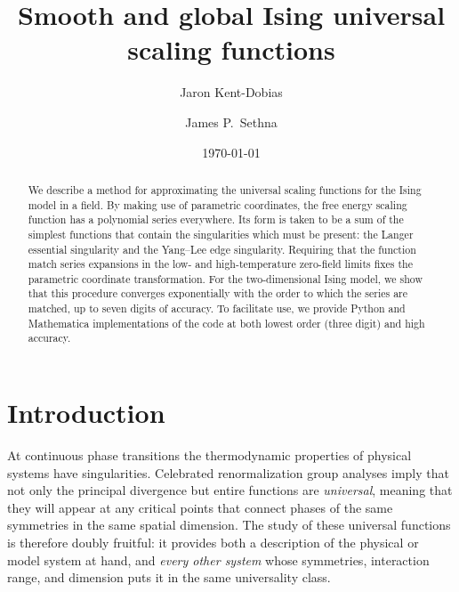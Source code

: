 \documentclass[
aps,
pre,
preprint,
longbibliography,
floatfix
]{revtex4-2}
\begin{document}
\title{Smooth and global Ising universal scaling functions}

\author{Jaron Kent-Dobias}

\author{James P.~Sethna}

\date\today

\begin{abstract}
  We describe a method for approximating the universal scaling functions for
  the Ising model in a field. By making use of parametric coordinates, the free
  energy scaling function has a polynomial series everywhere. Its form is
  taken to be a sum of the simplest functions that contain the singularities
  which must be present: the Langer essential singularity and the Yang--Lee
  edge singularity. Requiring that the function match series expansions in
  the low- and high-temperature zero-field limits fixes the parametric
  coordinate transformation. For the two-dimensional Ising model, we show that
  this procedure converges exponentially with the order to which the series are
  matched, up to seven digits of accuracy. 
  To facilitate use, we provide Python and Mathematica implementations of the code at both lowest order (three digit) and high accuracy.
\end{abstract}

\maketitle

\section{Introduction}

At continuous phase transitions the thermodynamic properties of physical
systems have singularities. Celebrated renormalization group analyses imply
that not only the principal divergence but entire functions are
\emph{universal}, meaning that they will appear at any critical points that
connect phases of the same symmetries in the same spatial dimension. The study
of these universal functions is therefore doubly fruitful: it provides both a
description of the physical or model system at hand, and \emph{every other
system} whose symmetries, interaction range, and dimension puts it in the same
universality class.
\end{document}
